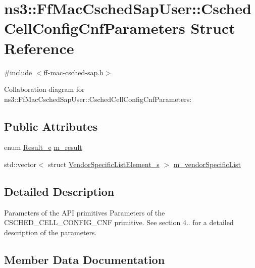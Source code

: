 \hypertarget{structns3_1_1FfMacCschedSapUser_1_1CschedCellConfigCnfParameters}{}\section{ns3\+:\+:Ff\+Mac\+Csched\+Sap\+User\+:\+:Csched\+Cell\+Config\+Cnf\+Parameters Struct Reference}
\label{structns3_1_1FfMacCschedSapUser_1_1CschedCellConfigCnfParameters}


{\ttfamily \#include $<$ff-\/mac-\/csched-\/sap.\+h$>$}



Collaboration diagram for ns3\+:\+:Ff\+Mac\+Csched\+Sap\+User\+:\+:Csched\+Cell\+Config\+Cnf\+Parameters\+:
\subsection*{Public Attributes}
\begin{DoxyCompactItemize}
\item 
enum \hyperlink{namespacens3_a7acf2b7f9e0781dfe43a6bc54d6ecd07}{Result\+\_\+e} \hyperlink{structns3_1_1FfMacCschedSapUser_1_1CschedCellConfigCnfParameters_a2db8ec602bba8a77130a84e962a95305}{m\+\_\+result}
\item 
std\+::vector$<$ struct \hyperlink{structns3_1_1VendorSpecificListElement__s}{Vendor\+Specific\+List\+Element\+\_\+s} $>$ \hyperlink{structns3_1_1FfMacCschedSapUser_1_1CschedCellConfigCnfParameters_a8c043d89323ac7ebca4a53b5fda1234d}{m\+\_\+vendor\+Specific\+List}
\end{DoxyCompactItemize}


\subsection{Detailed Description}
Parameters of the A\+PI primitives Parameters of the C\+S\+C\+H\+E\+D\+\_\+\+C\+E\+L\+L\+\_\+\+C\+O\+N\+F\+I\+G\+\_\+\+C\+NF primitive. See section 4.. for a detailed description of the parameters. 

\subsection{Member Data Documentation}
